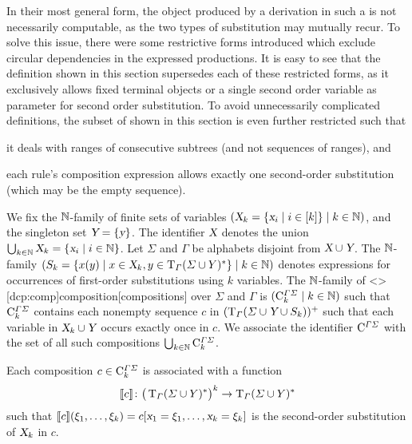 \documentclass[../document.tex]{subfiles}
\begin{document}
    In their most general form, the object produced by a derivation in such a  is not necessarily computable, as the two types of substitution may mutually recur.
    To solve this issue, there were some restrictive forms introduced which exclude circular dependencies in the expressed productions. \citep[Sec.~3.4 about non-circular attribute grammars]{Cou82}
    It is easy to see that the definition shown in this section supersedes each of these restricted forms, as it exclusively allows fixed terminal objects or a single second order variable as parameter for second order substitution.
    To avoid unnecessarily complicated definitions, the subset of  shown in this section is even further restricted such that
    \begin{inparaenum}
        \item it deals with ranges of consecutive subtrees (and not sequences of ranges), and
        \item each rule's composition expression allows exactly one second-order substitution (which may be the empty sequence).
    \end{inparaenum}

    \begin{definition}[Composition]
        We fix the \(\mathbb{N}\)-family of finite sets of variables \((\textsl{X}_k = \{\textsl{x}_i \mid i \in [k]\} \mid k \in \mathbb{N})\), and the singleton set \(\textsl{Y} = \{\textsl{y}\}\).
        The identifier \(\textsl{X}\) denotes the union \(\bigcup_{k \in \mathbb{N}} \textsl{X}_k = \{\textsl{x}_i \mid i \in \mathbb{N}\}\).
        Let \(\varSigma\) and \(\varGamma\) be alphabets disjoint from \(\textsl{X} \cup \textsl{Y}\).
        The \(\mathbb{N}\)-family \((S_k = \{x(y) \mid x \in \textsl{X}_k, y \in \operatorname{T}_\varGamma(\varSigma \cup Y)^*\} \mid k \in \mathbb{N})\) denotes expressions for occurrences of first-order substitutions using \(k\) variables.
        The \(\mathbb{N}\)-family of  <\dcp>[dcp:comp]{composition}[compositions] over \(\varSigma\) and \(\varGamma\) is \((\mathrm{C}^{\varGamma\varSigma}_k \mid k \in \mathbb{N})\) such that \(\mathrm{C}^{\varGamma\varSigma}_k\) contains each nonempty sequence \(c\) in \((\operatorname{T}_\varGamma(\varSigma \cup \textsl{Y} \cup S_k))^+\) such that each variable in \(\textsl{X}_k \cup \textsl{Y}\) occurs exactly once in \(c\).
        We associate the identifier \(\mathrm{C}^{\varGamma\varSigma}\) with the set of all such  compositions \(\bigcup_{k \in \mathbb{N}} \mathrm{C}^{\varGamma\varSigma}_{k}\).

        Each composition \(c \in \mathrm{C}^{\varGamma\varSigma}_k\) is associated with a function \[
            \llbracket c\rrbracket\colon \big(\operatorname{T}_\varGamma(\varSigma \cup Y)^*\big)^k \to \operatorname{T}_\varGamma(\varSigma \cup Y)^*
        \] such that \(\llbracket c\rrbracket(\xi_1, \ldots, \xi_k) = c[\textsl{x}_1=\xi_1, \ldots, \textsl{x}_k=\xi_k]\) is the second-order substitution of \(\textsl{X}_k\) in \(c\).
    \end{definition}
\end{document}
